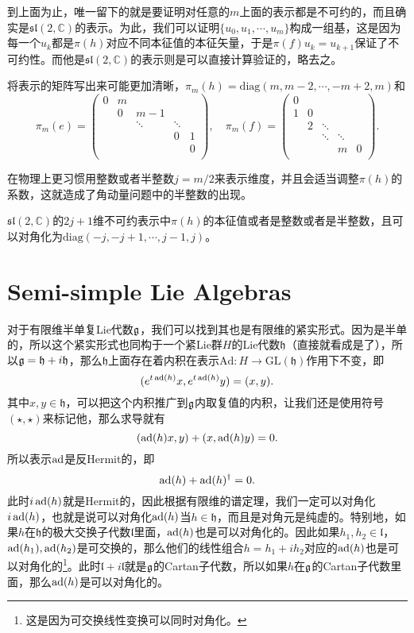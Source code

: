 到上面为止，唯一留下的就是要证明对任意的$m$上面的表示都是不可约的，而且确实是$\mathfrak{sl}(2,\mathbb{C})$的表示。为此，我们可以证明$\{u_0,u_1,\cdots,u_m\}$构成一组基，这是因为每一个$u_k$都是$\pi(h)$对应不同本征值的本征矢量，于是$\pi(f)u_k=u_{k+1}$保证了不可约性。而他是$\mathfrak{sl}(2,\mathbb{C})$的表示则是可以直接计算验证的，略去之。

将表示的矩阵写出来可能更加清晰，$\pi_m(h)=\mathrm{diag}(m,m-2,\cdots,-m+2,m)$和
\[
\pi_m(e)=\begin{pmatrix}
	0&m&&&\\
	&0&m-1&&\\
	&&\ddots&\ddots&\\
	&&&0&1\\
	&&&&0\\
\end{pmatrix},\quad
\pi_m(f)=\begin{pmatrix}
	0&&&&\\
	1&0&&&\\
	&2&\ddots&&\\
	&&\ddots&\ddots&\\
	&&&m&0\\
\end{pmatrix}.
\]

在物理上更习惯用整数或者半整数$j=m/2$来表示维度，并且会适当调整$\pi(h)$的系数，这就造成了角动量问题中的半整数的出现。

\pro $\mathfrak{sl}(2,\mathbb{C})$的$2j+1$维不可约表示中$\pi(h)$的本征值或者是整数或者是半整数，且可以对角化为$\mathrm{diag}(-j,-j+1,\cdots,j-1,j)$。

\section{Semi-simple Lie Algebras}

对于有限维半单复Lie代数${\mathfrak{g}}$，我们可以找到其也是有限维的紧实形式。因为是半单的，所以这个紧实形式也同构于一个紧Lie群$H$的Lie代数$\mathfrak{h}$（直接就看成是了），所以${\mathfrak{g}}=\mathfrak{h}+i\mathfrak{h}$，那么$\mathfrak{h}$上面存在着内积在表示$\mathrm{Ad}:H\to \mathrm{GL}(\mathfrak{h})$作用下不变，即
\[
	(e^{t\operatorname{ad}(h)}x,e^{t\operatorname{ad}(h)}y)=(x,y).
\]
其中$x,y\in\mathfrak{h}$，可以把这个内积推广到${\mathfrak{g}}$内取复值的内积，让我们还是使用符号$(\star,\star)$来标记他，那么求导就有
\[
	(\operatorname{ad}(h)x,y)+(x,\operatorname{ad}(h)y)=0.
\]
所以表示$\operatorname{ad}$是反Hermit的，即
\[
	\operatorname{ad}(h)+\operatorname{ad}(h)^\dag=0.
\]
此时$i\operatorname{ad}(h)$就是Hermit的，因此根据有限维的谱定理，我们一定可以对角化$i\operatorname{ad}(h)$，也就是说可以对角化$\operatorname{ad}(h)$当$h\in \mathfrak{h}$，而且是对角元是纯虚的。特别地，如果$h$在$\mathfrak{h}$的极大交换子代数$\mathfrak{l}$里面，$\operatorname{ad}(h)$也是可以对角化的。因此如果$h_1,h_2\in\mathfrak{l}$，$\operatorname{ad}(h_1),\operatorname{ad}(h_2)$是可交换的，那么他们的线性组合$h=h_1+ih_2$对应的$\operatorname{ad}(h)$也是可以对角化的\footnote{这是因为可交换线性变换可以同时对角化。}。此时$\mathfrak{l}+i\mathfrak{l}$就是${\mathfrak{g}}$的Cartan子代数，所以如果$h$在${\mathfrak{g}}$的Cartan子代数里面，那么$\operatorname{ad}(h)$是可以对角化的。

